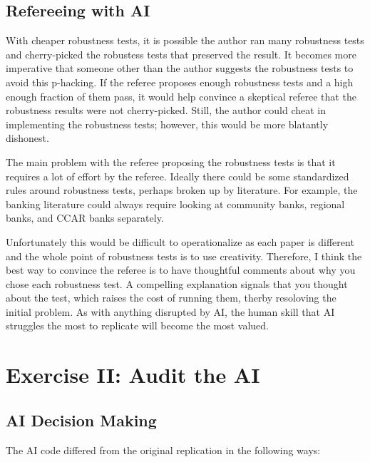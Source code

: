 \documentclass[11pt]{article}
\begin{document}
\subsection{Refereeing with AI}

With cheaper robustness tests, it is possible the author ran many robustness tests and cherry-picked the robustess tests that preserved the result. It becomes more imperative that someone other than the author suggests the robustness tests to avoid this p-hacking. If the referee proposes enough robustness tests and a high enough fraction of them pass, it would help convince a skeptical referee that the robustness results were not cherry-picked. Still, the author could cheat in implementing the robustness tests; however, this would be more blatantly dishonest.

The main problem with the referee proposing the robustness tests is that it requires a lot of effort by the referee. Ideally there could be some standardized rules around robustness tests, perhaps broken up by literature. For example, the banking literature could always require looking at community banks, regional banks, and CCAR banks separately. 

Unfortunately this would be difficult to operationalize as each paper is different and the whole point of robustness tests is to use creativity. Therefore, I think the best way to convince the referee is to have thoughtful comments about why you chose each robustness test. A compelling explanation signals that you thought about the test, which raises the cost of running them, therby resoloving the initial problem. As with anything disrupted by AI, the human skill that AI struggles the most to replicate will become the most valued.

\section{Exercise II: Audit the AI}

\subsection{AI Decision Making}

The AI code differed from the original replication in the following ways:
\end{document}
